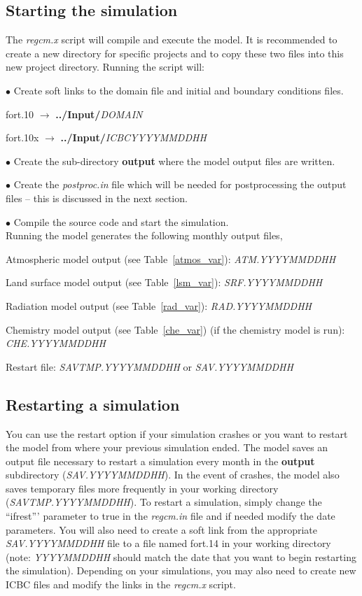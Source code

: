 \subsection{Starting the simulation}
The {\it regcm.x} script will compile and execute the model.  It is recommended to create a new
directory for specific projects and to copy these two files into this new project 
directory.  Running the script will: 

$\bullet$  Create soft links to the domain file and initial and boundary conditions
files. 

\indent \indent fort.10 $\rightarrow$ {\bf ../Input/}{\it DOMAIN}

\indent \indent fort.10x $\rightarrow$ {\bf ../Input/}{\it ICBCYYYYMMDDHH} 

$\bullet$  Create the sub-directory {\bf output} where the model output files are written. 

$\bullet$  Create the {\it postproc.in} file which will be needed for postprocessing the 
output files -- this is discussed in the next section. 

$\bullet$  Compile the source code and start the simulation. \\


\noindent Running the model generates the following monthly output files, 

\indent Atmospheric model output (see Table~\ref{atmos_var}): {\it ATM.YYYYMMDDHH} 

\indent Land surface model output (see Table~\ref{lsm_var}): {\it SRF.YYYYMMDDHH}  

\indent Radiation model output (see Table~\ref{rad_var}):  {\it RAD.YYYYMMDDHH}  

\indent Chemistry model output (see Table~\ref{che_var}) (if the chemistry model is run): {\it CHE.YYYYMMDDHH}  

\indent Restart file: {\it SAVTMP.YYYYMMDDHH} or {\it SAV.YYYYMMDDHH}


\subsection{Restarting a simulation}
You can use the restart option if your simulation crashes or you want to restart the model from where your previous simulation ended.  The model saves an output file  necessary 
to restart a simulation every month in the {\bf output} subdirectory ({\it SAV.YYYYMMDDHH}). 
In the event of crashes, the model also saves temporary files more frequently in your working 
directory ({\it SAVTMP.YYYYMMDDHH}).  To restart a simulation, simply change the 
``ifrest''' parameter to true in the {\it regcm.in} file and if needed modify the date 
parameters.  You will also need to create a soft link from the appropriate 
{\it SAV.YYYYMMDDHH} file to a file named fort.14 in your working directory 
(note:  {\it YYYYMMDDHH }should match the date that you want to begin restarting 
the simulation).  Depending on your simulations, you may also need to create 
new ICBC files and modify the links in the {\it regcm.x} script.


